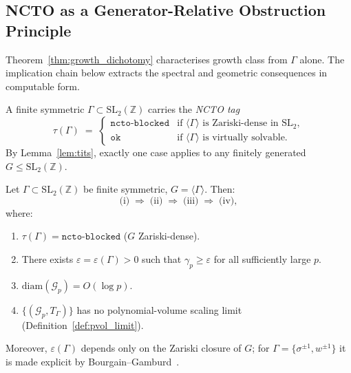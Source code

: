 \subsection{NCTO as a Generator-Relative Obstruction Principle}
\label{sec:ncto:gen}

Theorem~\ref{thm:growth_dichotomy} characterises growth class from $\Gamma$ alone.
The implication chain below extracts the spectral and geometric consequences
in computable form.

\begin{definition}
  \label{def:ncto_tag}
  A finite symmetric $\Gamma \subset \mathrm{SL}_2(\mathbb{Z})$ carries the
  \emph{NCTO tag}
  \[
    \tau(\Gamma) \;=\;
    \begin{cases}
      \texttt{ncto-blocked} & \text{if } \langle\Gamma\rangle
                              \text{ is Zariski-dense in } \mathrm{SL}_2, \\
      \texttt{ok}           & \text{if } \langle\Gamma\rangle
                              \text{ is virtually solvable.}
    \end{cases}
  \]
  By Lemma~\ref{lem:tits}, exactly one case applies to any finitely generated
  $G \leq \mathrm{SL}_2(\mathbb{Z})$.
\end{definition}

\begin{theorem}
  \label{thm:ncto_equiv}
  Let $\Gamma \subset \mathrm{SL}_2(\mathbb{Z})$ be finite symmetric,
  $G = \langle\Gamma\rangle$.  Then:
  \[
    \text{(i)} \;\Rightarrow\; \text{(ii)} \;\Rightarrow\; \text{(iii)}
    \;\Rightarrow\; \text{(iv)},
  \]
  where:
  \begin{enumerate}
    \item[\emph{(i)}]   $\tau(\Gamma) = \texttt{ncto-blocked}$ ($G$ Zariski-dense).
    \item[\emph{(ii)}]  There exists $\varepsilon = \varepsilon(\Gamma) > 0$ such that
                        $\gamma_p \geq \varepsilon$ for all sufficiently large $p$.
    \item[\emph{(iii)}] $\mathrm{diam}(\mathcal{G}_p) = O(\log p)$.
    \item[\emph{(iv)}]  $\{(\mathcal{G}_p, T_\Gamma)\}$ has no polynomial-volume
                        scaling limit (Definition~\ref{def:pvol_limit}).
  \end{enumerate}
  Moreover, $\varepsilon(\Gamma)$ depends only on the Zariski closure of $G$;
  for $\Gamma = \{\sigma^{\pm 1}, w^{\pm 1}\}$ it is made explicit by
  Bourgain--Gamburd~\cite{bourgain2008spectral}.
\end{theorem}

